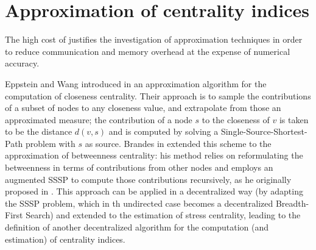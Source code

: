 
\section{Approximation of centrality indices}
\label{sec:mbfs}

The high cost of \deccen{} justifies the investigation of approximation techniques in order to reduce communication and memory overhead at the expense of numerical accuracy.


Eppstein and Wang introduced in \cite{ew2004} an approximation algorithm for the computation of closeness centrality. Their approach is to sample the contributions of a subset of nodes to any closeness value, and extrapolate from those an approximated measure; the contribution of a node $s$ to the closeness of $v$ is taken to be the distance $d(v,s)$ and is computed by solving a Single-Source-Shortest-Path problem with $s$ as source. Brandes in \cite{brandes2007} extended this scheme to the approximation of betweenness centrality: his method relies on reformulating the betweenness in terms of contributions from other nodes and employs an augmented SSSP to compute those contributions recursively, as he originally proposed in \cite{brandes2001}.
This approach can be applied in a decentralized way (by adapting the SSSP problem, which in th undirected case becomes a decentralized Breadth-First Search) and extended to the estimation of stress centrality, leading to the definition of another decentralized algorithm for the computation (and estimation) of centrality indices.


